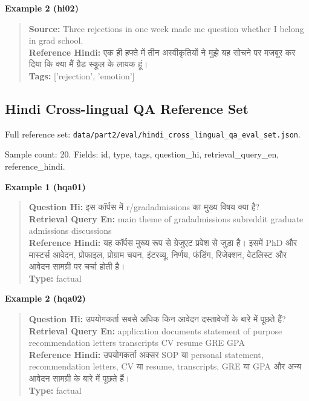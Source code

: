 \documentclass[11pt]{article}
\begin{document}
\textbf{Example 2 (hi02)}
\begin{quote}\small
\textbf{Source:} Three rejections in one week made me question whether I belong in grad school.\\
\textbf{Reference Hindi:} {\hindifont एक ही हफ्ते में तीन अस्वीकृतियों ने मुझे यह सोचने पर मजबूर कर दिया कि क्या मैं ग्रैड स्कूल के लायक हूं।}\\
\textbf{Tags:} ['rejection', 'emotion']\\
\end{quote}

        \subsection*{Hindi Cross-lingual QA Reference Set}

Full reference set: \texttt{data/part2/eval/hindi\_cross\_lingual\_qa\_eval\_set.json}.

Sample count: 20. Fields: id, type, tags, question\_hi, retrieval\_query\_en, reference\_hindi.

\textbf{Example 1 (hqa01)}
\begin{quote}\small
\textbf{Question Hi:} {\hindifont इस कॉर्पस में r/gradadmissions का मुख्य विषय क्या है?}\\
\textbf{Retrieval Query En:} main theme of gradadmissions subreddit graduate admissions discussions\\
\textbf{Reference Hindi:} {\hindifont यह कॉर्पस मुख्य रूप से ग्रेजुएट प्रवेश से जुड़ा है। इसमें PhD और मास्टर्स आवेदन, प्रोफाइल, प्रोग्राम चयन, इंटरव्यू, निर्णय, फंडिंग, रिजेक्शन, वेटलिस्ट और आवेदन सामग्री पर चर्चा होती है।}\\
\textbf{Type:} factual\\
\end{quote}

\textbf{Example 2 (hqa02)}
\begin{quote}\small
\textbf{Question Hi:} {\hindifont उपयोगकर्ता सबसे अधिक किन आवेदन दस्तावेजों के बारे में पूछते हैं?}\\
\textbf{Retrieval Query En:} application documents statement of purpose recommendation letters transcripts CV resume GRE GPA\\
\textbf{Reference Hindi:} {\hindifont उपयोगकर्ता अक्सर SOP या personal statement, recommendation letters, CV या resume, transcripts, GRE या GPA और अन्य आवेदन सामग्री के बारे में पूछते हैं।}\\
\textbf{Type:} factual\\
\end{quote}
\end{document}
